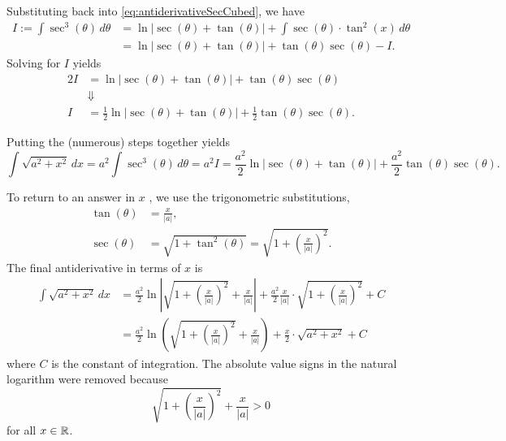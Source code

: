 Substituting back into \eqref{eq:antiderivativeSecCubed}, we have
\begin{equation}
\label{eq:antiderivativeSecCubedStep3}
\begin{aligned}
    I:=  \int \sec^3(\theta) \, d\theta   & =  \ln|\sec(\theta) + \tan(\theta)| + \int  \sec(\theta)  \cdot  \tan^2(x) \, d\theta \\[1em]
    &= \ln|\sec(\theta) + \tan(\theta)| + \tan(\theta) \sec(\theta) - I.
\end{aligned}  
\end{equation}
Solving for $I$ yields
\begin{equation}
\label{eq:antiderivativeSecCubedStep4}
\begin{aligned}
    2 I &=  \ln|\sec(\theta) + \tan(\theta)| + \tan(\theta) \sec(\theta) \\
    & \Downarrow \\
    I &= \frac{1}{2}  \ln|\sec(\theta) + \tan(\theta)| + \frac{1}{2} \tan(\theta) \sec(\theta). 
\end{aligned}  
\end{equation}

Putting the (numerous) steps together yields
$$ \int \sqrt{a^2 + x^2} \, dx = a^2  \int \sec^3(\theta) \, d\theta = a^2 I =  \frac{a^2}{2}  \ln|\sec(\theta) + \tan(\theta)| + \frac{a^2}{2} \tan(\theta) \sec(\theta).$$

To return to an answer in \( x \) , we use the trigonometric substitutions,
\begin{align*}
\tan(\theta) &= \frac{x}{|a|}, \\
\sec(\theta) &=  \sqrt{1 + \tan^2(\theta)}  = \sqrt{1 + \left(\frac{x}{|a|}\right)^2}.
\end{align*}
The final antiderivative in terms of \( x \) is
\begin{align*}
    \int \sqrt{a^2 + x^2} \, dx & = \frac{a^2}{2}  \ln\left| \sqrt{1 + \left(\frac{x}{|a|}\right)^2} + \frac{x}{|a|}\right| + \frac{a^2}{2}  \frac{x}{|a|}\cdot\sqrt{1 + \left(\frac{x}{|a|}\right)^2} +C \\[1em]
    &=    \frac{a^2}{2}  \ln\left(\sqrt{1 + \left(\frac{x}{|a|}\right)^2} + \frac{x}{|a|}\right) + \frac{x}{2} \cdot \sqrt{a^2 + x^2} +C 
\end{align*}
where \( C \) is the constant of integration. The absolute value signs in the natural logarithm were removed because 
$$\sqrt{1 + \left(\frac{x}{|a|}\right)^2} + \frac{x}{|a|} >0$$
for all $x \in \mathbb R$.\\

